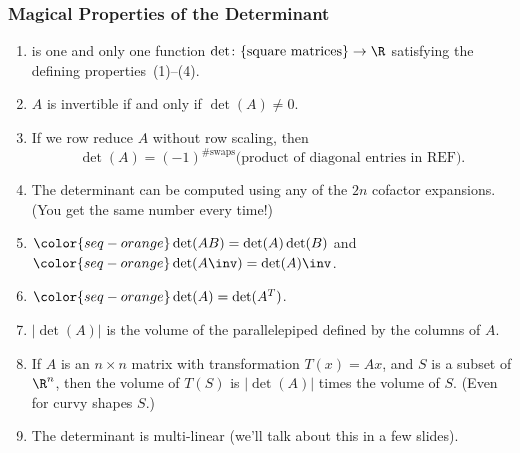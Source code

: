 
\begin{frame}
\frametitle{Magical Properties of the Determinant}

\begin{enumerate}
\item {} is one and only one function
  $\det\colon\{\text{square matrices}\}\to\R$ satisfying the defining
  properties~(1)--(4).
\pause\smallskip
\item $A$ is invertible if and only if $\det(A) \neq 0$.
\pause\smallskip
\item If we row reduce $A$ without row scaling, then
  \[ \det(A) = (-1)^{\text{\#swaps}}
  \bigl( \text{product of diagonal entries in REF} \bigr). \]
\pause\null\vskip -9mm\null
\item The determinant can be computed using any of the $2n$ cofactor expansions.
  (You get the same number every time!)
\pause\smallskip
\item $\color{seq-orange}\det(AB) = \det(A)\det(B)$ \quad and \quad
  $\color{seq-orange}\det(A\inv) = \det(A)\inv$.
\pause\smallskip
\item $\color{seq-orange}\det(A) = \det(A^T)$.
\pause\smallskip
\item $|\det(A)|$ is the volume of the parallelepiped defined by the columns of
  $A$.
\pause\smallskip
\item If $A$ is an $n\times n$ matrix with transformation $T(x)=Ax$, and $S$ is a
  subset of $\R^n$, then the volume of $T(S)$ is $|\det(A)|$ times the volume of
  $S$.  (Even for curvy shapes $S$.)
\pause\smallskip
\item The determinant is multi-linear (we'll talk about this in a few slides).
\end{enumerate}
\pause
{}

\end{frame}



